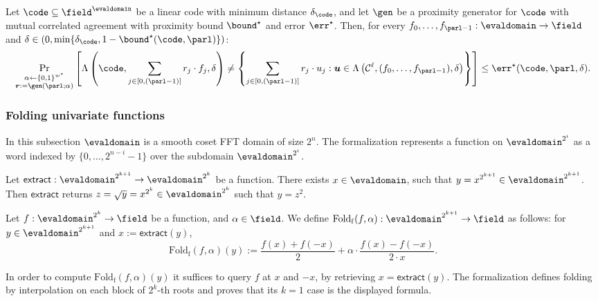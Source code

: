 \begin{lemma}\label{lemma: mutual_corrAgr_listdecoding}
    Let $\code \subseteq \field^{\evaldomain}$ be a linear code with minimum distance $\delta_{\code}$, and let $\gen$ be a proximity generator for $\code$ with mutual correlated agreement with proximity bound ${\bound}^\star$ and error $\err^\star$. Then, for every $f_0, \ldots, f_{\parl-1} : \evaldomain \to \field$ and $\delta \in (0, \min\{\delta_{\code}, 1 - {\bound}^\star(\code, \parl)\})$:
    \[
    \Pr_{\substack{\alpha \leftarrow \{0,1\}^{w^\star} \\ \boldsymbol{r} := \gen(\parl; \alpha)}} \left[
    \Lambda\left(\code, \sum_{j \in [0,(\parl-1)]} r_j \cdot f_j, \delta \right) \neq
    \left\{ \sum_{j \in [0,(\parl-1)]} r_j \cdot u_j : \boldsymbol{u} \in \Lambda\left(\mathcal{C}^\ell, (f_0, \ldots, f_{\parl-1}), \delta \right) \right\}
    \right] \leq \err^\star(\code, \parl, \delta).
    \]
\end{lemma}

\subsubsection{Folding univariate functions}

In this subsection $\evaldomain$ is a smooth coset FFT domain of size $2^n$. The formalization
represents a function on $\evaldomain^{2^i}$ as a word indexed by $\{0,\ldots,2^{n-i}-1\}$ over
the subdomain $\evaldomain^{2^i}$.

\begin{definition}\label{def:extract}
\leanok
    Let $\mathsf{extract}:\evaldomain^{2^{k+1}}\rightarrow \evaldomain^{2^k}$ be a function. There exists $x \in \evaldomain$, such that $y = x^{2^{k+1}}\in\evaldomain^{2^{k+1}}$. Then $\mathsf{extract}$ returns $z = \sqrt{y} = x^{2^k}\in\evaldomain^{2^k}$ such that $y = z^2$.
\end{definition}

\begin{definition}\label{def:foldf}
\leanok
{}
    Let $f : \evaldomain^{2^k} \to \field$ be a function, and $\alpha \in \field$. We define $\mathrm{Fold_f}(f, {\alpha}) : \evaldomain^{2^{k+1}} \to \field$ as follows: for $y \in \evaldomain^{2^{k+1}}$ and $x := \mathsf{extract}(y)$,
    \[
    \mathrm{Fold_f}(f, \alpha)(y) := \frac{f(x) + f(-x)}{2} + \alpha \cdot \frac{f(x) - f(-x)}{2 \cdot x}.
    \]

    In order to compute $\mathrm{Fold_f}(f, \alpha)(y)$ it suffices to query $f$ at $x$ and $-x$, by retrieving $x=\mathsf{extract}(y)$.
    The formalization defines folding by interpolation on each block of $2^k$-th roots and proves
    that its $k=1$ case is the displayed formula.
\end{definition}

